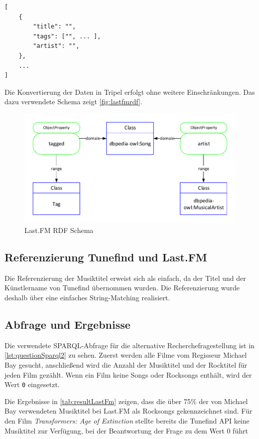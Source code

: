 \documentclass[parskip]{scrartcl}
\begin{document}
\begin{lstlisting}[caption={JSON-Format Last.FM}, label={lst:jsonLastfm}]
[
    {
        "title": "",
        "tags": ["", ... ],
        "artist": "",
    },
    ...
]
\end{lstlisting}

Die Konvertierung der Daten in Tripel erfolgt ohne weitere Einschränkungen. Das dazu verwendete Schema zeigt \autoref{fig:lastfmrdf}.

\begin{figure}[H]
    \centering
    \includegraphics[scale=0.8]{lastfm}
    \caption{Last.FM RDF Schema}
    \label{fig:lastfmrdf}
\end{figure}

\subsection{Referenzierung Tunefind und Last.FM}

Die Referenzierung der Musiktitel erweist sich als einfach, da der Titel und der Künstlername von Tunefind übernommen wurden. Die Referenzierung wurde deshalb über eine einfaches String-Matching realisiert.

\subsection{Abfrage und Ergebnisse}

Die verwendete SPARQL-Abfrage für die alternative Recherchefragestellung ist in \autoref{lst:questionSparql2} zu sehen. Zuerst werden alle Filme vom Regisseur Michael Bay gesucht, anschließend wird die Anzahl der Musiktitel und der Rocktitel für jeden Film gezählt. Wenn ein Film keine Songs oder Rocksongs enthält, wird der Wert \texttt{0} eingesetzt.

Die Ergebnisse in \autoref{tab:resultLastFm} zeigen, dass die über 75\% der von Michael Bay verwendeten Musiktitel bei Last.FM als Rocksongs gekennzeichnet sind. Für den Film \textit{Transformers: Age of Extinction} stellte bereits die Tunefind API keine Musiktitel zur Verfügung, bei der Beantwortung der Frage zu dem Wert 0 führt
\end{document}
